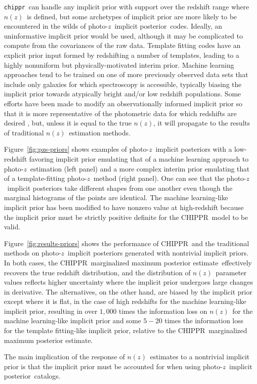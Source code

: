 \documentclass[iop]{emulateapj}
\newcommand{\Fig}[1]{Figure~\ref{#1}}
\newcommand{\project}[1]{\textsc{#1}}
\newcommand{\Chippr}{\project{CHIPPR}}
\newcommand{\repo}[1]{\texttt{#1}}
\newcommand{\chippr}{\repo{chippr}}
\newcommand{\pz}{photo-$z$}
\newcommand{\pzip}{\pz\ implicit posterior}
\newcommand{\nz}{$n(z)$}
\newcommand{\mmle}{marginalized maximum posterior estimate}
\begin{document}
\chippr\ can handle any implicit prior with support over the redshift range where \nz\ is defined, but some archetypes of implicit prior are more likely to be encountered in the wilds of \pzip\ codes.
Ideally, an uninformative implicit prior would be used, although it may be complicated to compute from the covariances of the raw data.  
Template fitting codes have an explicit prior input formed by redshifting a number of templates, leading to a highly nonuniform but physically-motivated interim prior.
Machine learning approaches tend to be trained on one of more previously observed data sets that include only galaxies for which spectroscopy is accessible, typically biasing the implicit prior towards atypically bright and/or low redshift populations.
Some efforts have been made to modify an observationally informed implicit prior so that it is more representative of the photometric data for which redshifts are desired \citep{sheldon_photometric_2012}, but, unless it is equal to the true \nz, it will propagate to the results of traditional \nz\ estimation methods.  

\Fig{fig:pzs-priors} shows examples of \pzip s with a low-redshift favoring implicit prior emulating that of a machine learning approach to \pz\ estimation (left panel) and a more complex interim prior emulating that of a template-fitting \pz\ method (right panel).
One can see that the \pzip s take different shapes from one another even though the marginal histograms of the points are identical.
The machine learning-like implicit prior has been modified to have nonzero value at high-redshift because the implicit prior must be strictly positive definite for the \Chippr\ model to be valid.

\Fig{fig:results-priors} shows the performance of \Chippr\ and the traditional methods on \pzip s generated with nontrivial implicit priors.
In both cases, the \Chippr\ \mmle\ effectively recovers the true redshift distribution, and the distribution of \nz\ parameter values reflects higher uncertainty where the implicit prior undergoes large changes in derivative.
The alternatives, on the other hand, are biased by the implicit prior except where it is flat, in the case of high redshifts for the machine learning-like implicit prior, resulting in over $1,000$ times the information loss on \nz\ for the machine learning-like implicit prior and some $5-20$ times the information loss for the template fitting-like implicit prior, relative to the \Chippr\ \mmle.

The main implication of the response of \nz\ estimates to a nontrivial implicit prior is that the implicit prior must be accounted for when using \pzip\ catalogs.
\end{document}
